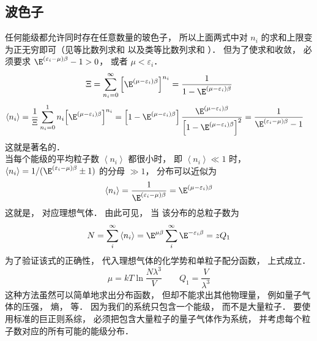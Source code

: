 \subsection{波色子} 
任何能级都允许同时存在任意数量的玻色子， 所以上面两式中对 ${n_i}$ 的求和上限变为正无穷即可（见等比数列求和%
以及类等比数列求和%
）． 但为了使求和收敛， 必须要求 ${\E^{\left( {{\varepsilon_i} - \mu } \right)\beta }} - 1 > 0$，  或者 $\mu  < {\varepsilon_i}$． 
\begin{equation}
  \Xi  = \sum\limits_{{n_i} = 0}^\infty  {{\left[ {\E^{\left( {\mu  - {\varepsilon_i}} \right)\beta }} \right]}^{n_i}}  = \frac{1}{1 - {\E^{\left( {\mu  - {\varepsilon_i}} \right)\beta }}}
\end{equation}
\begin{equation}
\begin{aligned}
  \left\langle {n_i} \right\rangle & = \frac{1}{\Xi }\sum\limits_{{n_i} = 0}^1 {{n_i}{{\left[ {\E^{\left( {\mu  - {\varepsilon_i}} \right)\beta }} \right]}^{n_i}}} = \left[ {1 - {\E^{\left( {\mu  - {\varepsilon_i}} \right)\beta }}} \right]\frac{\E^{\left( {\mu  - {\varepsilon_i}} \right)\beta }}{{\left[ {1 - {\E^{\left( {\mu  - {\varepsilon_i}} \right)\beta }}} \right]}^2}  = \frac{1}{{\E^{\left( {{\varepsilon_i} - \mu } \right)\beta }} - 1}
  \end{aligned}
\end{equation}
这就是著名的．\\
当每个能级的平均粒子数 $\left\langle {{n_i}} \right\rangle $ 都很小时， 即 $\left\langle {{n_i}} \right\rangle \ll 1$ 时， $\left\langle {{n_i}} \right\rangle  = {1}/({{{\E^{\left( {{\varepsilon_i} - \mu } \right)\beta }} \pm 1}})$ 的分母 $ \gg 1$，  分布可以近似为
\begin{equation}
  \left\langle {n_i} \right\rangle  = \frac{1}{\E^{\left( {{\varepsilon_i} - \mu } \right)\beta }} = {\E^{\left( {\mu  - {\varepsilon_i}} \right)\beta }}
\end{equation}
这就是， 对应理想气体． 由此可见， 当 %
该分布的总粒子数为
\begin{equation}
  N = \sum\limits_i^\infty  {\left\langle {n_i} \right\rangle }  = {\E^{\mu \beta }}\sum\limits_i^\infty  {\E^{ - {\varepsilon_i}\beta }}  = z{Q_1}
\end{equation}
为了验证该式的正确性， 代入理想气体的化学势和单粒子配分函数， 上式成立．
\begin{equation}
  \mu  = kT\ln \frac{N{\lambda ^3}}{V} 
  \qquad
  {Q_1} = \frac{V}{\lambda ^3}
\end{equation}
这种方法虽然可以简单地求出分布函数， 但却不能求出其他物理量， 例如量子气体的压强， 熵， 等． 因为我们的系统只包含一个能级， 而不是大量粒子． 要使用标准的巨正则系综， 必须把包含大量粒子的量子气体作为系统， 并考虑每个粒子数对应的所有可能的能级分布．\\